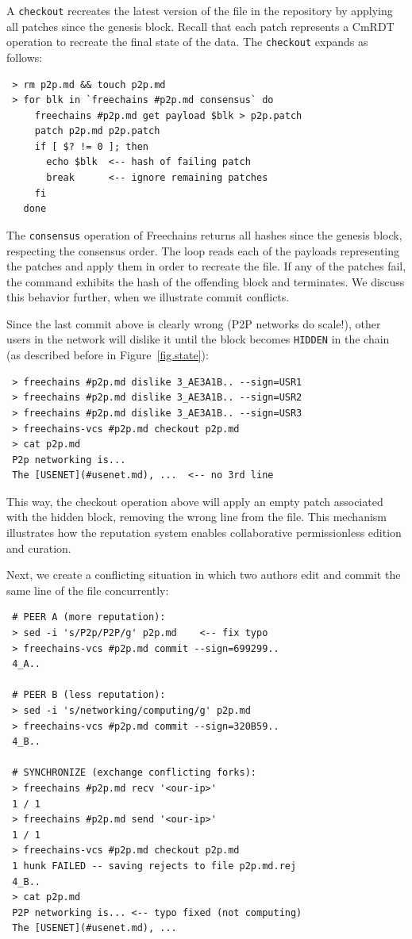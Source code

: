 \documentclass[10pt,journal,compsoc]{IEEEtran}
\newcommand{\FC}       {Freechains\xspace}
\newcommand{\code}[1]  {\texttt{\footnotesize{#1}}}
\begin{document}
A \code{checkout} recreates the latest version of the file in the repository by
applying all patches since the genesis block.
Recall that each patch represents a CmRDT operation to recreate the final state
of the data.
The \code{checkout} expands as follows:

{\footnotesize
\begin{verbatim}
 > rm p2p.md && touch p2p.md
 > for blk in `freechains #p2p.md consensus` do
     freechains #p2p.md get payload $blk > p2p.patch
     patch p2p.md p2p.patch
     if [ $? != 0 ]; then
       echo $blk  <-- hash of failing patch
       break      <-- ignore remaining patches
     fi
   done
\end{verbatim}
}

The \code{consensus} operation of \FC returns all hashes since
the genesis block, respecting the consensus order.
The loop reads each of the payloads representing the patches and apply them in
order to recreate the file.
If any of the patches fail, the command exhibits the hash of the offending
block and terminates.
We discuss this behavior further, when we illustrate commit conflicts.

Since the last commit above is clearly wrong (P2P networks do scale!), other
users in the network will dislike it until the block becomes
\code{HIDDEN} in the chain (as described before in Figure~\ref{fig.state}):

{\footnotesize
\begin{verbatim}
 > freechains #p2p.md dislike 3_AE3A1B.. --sign=USR1
 > freechains #p2p.md dislike 3_AE3A1B.. --sign=USR2
 > freechains #p2p.md dislike 3_AE3A1B.. --sign=USR3
 > freechains-vcs #p2p.md checkout p2p.md
 > cat p2p.md
 P2p networking is...
 The [USENET](#usenet.md), ...  <-- no 3rd line
\end{verbatim}
}

This way, the checkout operation above will apply an empty patch associated
with the hidden block, removing the wrong line from the file.
This mechanism illustrates how the reputation system enables collaborative
permissionless edition and curation.

Next, we create a conflicting situation in which two authors edit and commit
the same line of the file concurrently:

{\footnotesize
\begin{verbatim}
 # PEER A (more reputation):
 > sed -i 's/P2p/P2P/g' p2p.md    <-- fix typo
 > freechains-vcs #p2p.md commit --sign=699299..
 4_A..

 # PEER B (less reputation):
 > sed -i 's/networking/computing/g' p2p.md
 > freechains-vcs #p2p.md commit --sign=320B59..
 4_B..

 # SYNCHRONIZE (exchange conflicting forks):
 > freechains #p2p.md recv '<our-ip>'
 1 / 1
 > freechains #p2p.md send '<our-ip>'
 1 / 1
 > freechains-vcs #p2p.md checkout p2p.md
 1 hunk FAILED -- saving rejects to file p2p.md.rej
 4_B..
 > cat p2p.md
 P2P networking is... <-- typo fixed (not computing)
 The [USENET](#usenet.md), ...
\end{verbatim}
}
\end{document}
